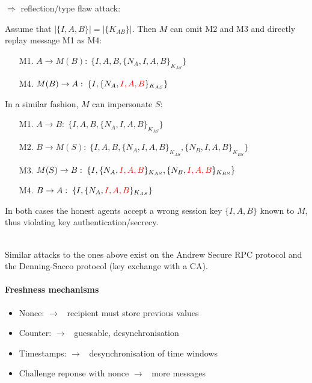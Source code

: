 $\Rightarrow$ reflection/type flaw attack:

Assume that $|\{I,A,B\}| = |\{K_{AB}\}|$. Then $M$ can omit M2 and M3 and directly replay message M1 as M4:

\begin{enumerate}[leftmargin=4cm]
    \item[M1.] $A \rightarrow M(B):\; \{ I,A,B,\{N_A,I,A,B\}_{K_{AS}} \} $
    \item[M4.] $M(B) \rightarrow A:\; \{ I,\{N_A,\textcolor{red}{I,A,B}\}_{K_{AS}} \} $
\end{enumerate}

In a similar fashion, $M$ can impersonate $S$:
\begin{enumerate}[leftmargin=4cm]
    \item[M1.] $A \rightarrow B:\; \{ I,A,B,\{N_A,I,A,B\}_{K_{AS}} \} $
    \item[M2.] $B \rightarrow M(S):\; \{ I,A,B,\{N_A,I,A,B\}_{K_{AS}}, \{N_B,I,A,B\}_{K_{BS}} \} $
    \item[M3.] $M(S) \rightarrow B:\; \{ I,\{N_A,\textcolor{red}{I,A,B}\}_{K_{AS}}, \{N_B,\textcolor{red}{I,A,B}\}_{K_{BS}} \} $
    \item[M4.] $B \rightarrow A:\; \{ I,\{N_A,\textcolor{red}{I,A,B} \}_{K_{AS}} \} $
\end{enumerate}

In both cases the honest agents accept a wrong session key $\{ I,A,B \}$ known to $M$, thus violating key authentication/secrecy.

\mbox{}\\
Similar attacks to the ones above exist on the Andrew Secure RPC protocol and the Denning-Sacco protocol (key exchange with a CA).

\paragraph{Freshness mechanisms}

\begin{itemize}
    \item Nonce: $\longrightarrow$ \Lightning\ recipient must store previous values
    \item Counter: $\longrightarrow$ \Lightning\ guessable, desynchronisation
    \item Timestamps: $\longrightarrow$ \Lightning\ desynchronisation of time windows
    \item Challenge reponse with nonce $\longrightarrow$ \Lightning\ more messages
\end{itemize}



